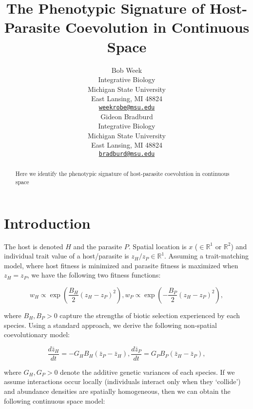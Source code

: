 \documentclass{article}
\title{The Phenotypic Signature of Host-Parasite Coevolution in Continuous
Space}
\author{
    Bob Week
   \\
    Integrative Biology \\
    Michigan State University \\
  East Lansing, MI 48824 \\
  \texttt{\href{mailto:weekrobe@msu.edu}{\nolinkurl{weekrobe@msu.edu}}} \\
   \And
    Gideon Bradburd
   \\
    Integrative Biology \\
    Michigan State University \\
  East Lansing, MI 48824 \\
  \texttt{\href{mailto:bradburd@msu.edu}{\nolinkurl{bradburd@msu.edu}}} \\
  }
\begin{document}
\maketitle

\def\tightlist{}


\begin{abstract}
Here we identify the phenotypic signature of host-parasite coevolution
in continuous space
\end{abstract}


\hypertarget{introduction}{%
\section{Introduction}\label{introduction}}

The host is denoted \(H\) and the parasite \(P\). Spatial location is
\(x\) (\(\in\mathbb R^1\) or \(\mathbb R^2\)) and individual trait value
of a host/parasite is \(z_H/z_P\in\mathbb R^1\). Assuming a
trait-matching model, where host fitness is minimized and parasite
fitness is maximized when \(z_H=z_P\), we have the following two fitness
functions:

\begin{subequations}
  \begin{equation}
    w_H\propto \exp\left(\frac{B_H}{2}(z_H-z_P)^2\right),
  \end{equation}
  \begin{equation}
    w_P\propto \exp\left(-\frac{B_P}{2}(z_H-z_P)^2\right),
  \end{equation}
\end{subequations}

where \(B_H,B_P>0\) capture the strengths of biotic selection
experienced by each species. Using a standard approach, we derive the
following non-spatial coevolutionary model:

\begin{subequations}
  \begin{equation}
    \frac{d\bar z_H}{dt}=-G_HB_H(\bar z_P-\bar z_H),
  \end{equation}
  \begin{equation}
    \frac{d\bar z_P}{dt}=G_PB_P(\bar z_H-\bar z_P),
  \end{equation}
\end{subequations}

where \(G_H,G_P>0\) denote the additive genetic variances of each
species. If we assume interactions occur locally (individuals interact
only when they `collide') and abundance densities are spatially
homogeneous, then we can obtain the following continuous space model:
\end{document}
